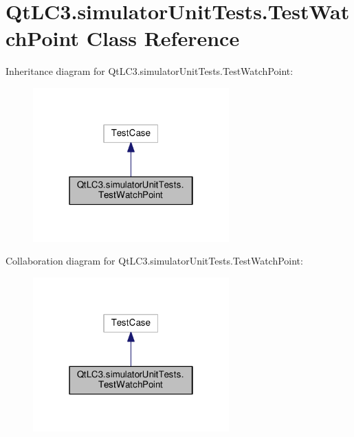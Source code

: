 \hypertarget{class_qt_l_c3_1_1simulator_unit_tests_1_1_test_watch_point}{\section{Qt\-L\-C3.\-simulator\-Unit\-Tests.\-Test\-Watch\-Point Class Reference}
\label{class_qt_l_c3_1_1simulator_unit_tests_1_1_test_watch_point}
}


Inheritance diagram for Qt\-L\-C3.\-simulator\-Unit\-Tests.\-Test\-Watch\-Point\-:
\nopagebreak
\begin{figure}[H]
\begin{center}
\leavevmode
\includegraphics[width=214pt]{class_qt_l_c3_1_1simulator_unit_tests_1_1_test_watch_point__inherit__graph}
\end{center}
\end{figure}


Collaboration diagram for Qt\-L\-C3.\-simulator\-Unit\-Tests.\-Test\-Watch\-Point\-:
\nopagebreak
\begin{figure}[H]
\begin{center}
\leavevmode
\includegraphics[width=214pt]{class_qt_l_c3_1_1simulator_unit_tests_1_1_test_watch_point__coll__graph}
\end{center}
\end{figure}
